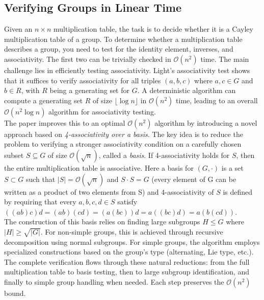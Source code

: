 
\subsection{Verifying Groups in Linear Time}
Given an \(n \times n\) multiplication table, the task is to decide whether it is a Cayley multiplication table of a group. To determine whether a multiplication table describes a group, you need to test for the identity element, inverses, and associativity. The first two can be trivially checked in \(\mathcal{O}(n^2)\) time. The main challenge lies in efficiently testing associativity. Light's associativity test shows that it suffices to verify associativity for all triples \((a, b, c)\) where \(a, c \in G\) and \(b \in R\), with \(R\) being a generating set for \(G\). A deterministic algorithm can compute a generating set \(R\) of size \(\lfloor \log n \rfloor\) in \(\mathcal{O}(n^2)\) time, leading to an overall \(\mathcal{O}(n^2 \log n)\) algorithm for associativity testing. 
\\
The paper improves this to an optimal \(\mathcal{O}(n^2)\) algorithm by introducing a novel approach based on \emph{4-associativity over a basis}. The key idea is to reduce the problem to verifying a stronger associativity condition on a carefully chosen subset \(S \subseteq G\) of size \(\mathcal{O}(\sqrt{n})\), called a \emph{basis}. If 4-associativity holds for \(S\), then the entire multiplication table is associative. Here a basis for \((G, \cdot)\) is a set \(S \subset G\) such that \(|S| = \mathcal{O}(\sqrt{n})\) and \(S \cdot S = G\) (every element of G can be written as a product of two elements from S) and 4-associativity of \(S\) is defined by requiring that every \(a, b, c, d \in S\) satisfy \(((ab)c)d = (ab)(cd) = (a(bc))d = a((bc)d) = a(b(cd))\).
\\
The construction of this basis relies on finding large subgroups \(H \leq G\) where \(|H| \geq \sqrt{|G|}\). For non-simple groups, this is achieved through recursive decomposition using normal subgroups. For simple groups, the algorithm employs specialized constructions based on the group's type (alternating, Lie type, etc.).
The complete verification flows through these natural reductions: from the full multiplication table to basis testing, then to large subgroup identification, and finally to simple group handling when needed. Each step preserves the \(\mathcal{O}(n^2)\) bound.